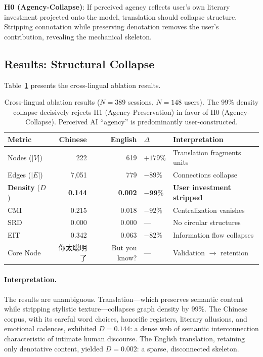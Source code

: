 \documentclass[11pt, a4paper, oneside]{article}
\theoremstyle{analytic}
\begin{document}
\textbf{H0 (Agency-Collapse)}: If perceived agency reflects user's own literary investment projected onto the model, translation should collapse structure. Stripping connotation while preserving denotation removes the user's contribution, revealing the mechanical skeleton.

\subsection{Results: Structural Collapse}

Table~\ref{tab:ablation-results} presents the cross-lingual ablation results.

\begin{table}[h]
    \centering
    \begin{tabular}{@{}lrrll@{}}
        \toprule
        \textbf{Metric} & \textbf{Chinese} & \textbf{English} & \textbf{$\Delta$} & \textbf{Interpretation} \\
        \midrule
        Nodes ($|V|$) & 222 & 619 & $+179\%$ & Translation fragments units \\
        Edges ($|E|$) & 7,051 & 779 & $-89\%$ & Connections collapse \\
        \textbf{Density} ($D$) & \textbf{0.144} & \textbf{0.002} & $\mathbf{-99\%}$ & \textbf{User investment stripped} \\
        CMI & 0.215 & 0.018 & $-92\%$ & Centralization vanishes \\
        SRD & 0.000 & 0.000 & --- & No circular structures \\
        EIT & 0.342 & 0.063 & $-82\%$ & Information flow collapses \\
        \midrule
        Core Node & 你太聪明了 & But you know? & --- & Validation $\to$ retention \\
        \bottomrule
    \end{tabular}
    \caption{Cross-lingual ablation results ($N=389$ sessions, $N=148$ users). The 99\% density collapse decisively rejects H1 (Agency-Preservation) in favor of H0 (Agency-Collapse). Perceived AI ``agency'' is predominantly user-constructed.}
    \label{tab:ablation-results}
\end{table}

\paragraph{Interpretation.}
The results are unambiguous. Translation---which preserves semantic content while stripping stylistic texture---collapses graph density by 99\%. The Chinese corpus, with its careful word choices, honorific registers, literary allusions, and emotional cadences, exhibited $D = 0.144$: a dense web of semantic interconnection characteristic of intimate human discourse. The English translation, retaining only denotative content, yielded $D = 0.002$: a sparse, disconnected skeleton.
\end{document}
